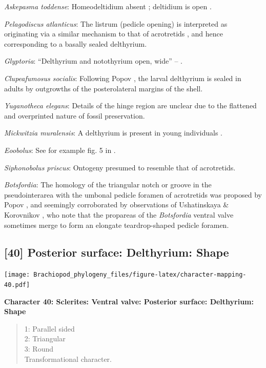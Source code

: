 \documentclass[]{book}
\theoremstyle{definition}
\theoremstyle{definition}
\theoremstyle{definition}
\theoremstyle{remark}
\begin{document}
\emph{Askepasma toddense}: Homeodeltidium absent
\citep[p.~153]{Williams2000BrachiopodaLinguliformea}; deltidium is open
\citep[see][fig. 4]{Topper2013Theoldest}.

\emph{Pelagodiscus atlanticus}: The listrum (pedicle opening) is
interpreted as originating via a similar mechanism to that of
acrotretids \citep{Popov1992TheCambrian}, and hence corresponding to a
basally sealed delthyrium.

\emph{Glyptoria}: ``Delthyrium and notothyrium open, wide'' --
\citet{Cooper1976LowerCambrian}.

\emph{Clupeafumosus socialis}: Following Popov
\citeyearpar{Popov1992TheCambrian}, the larval delthyrium is sealed in
adults by outgrowths of the posterolateral margins of the shell.

\emph{Yuganotheca elegans}: Details of the hinge region are unclear due
to the flattened and overprinted nature of fossil preservation.

\emph{Mickwitzia muralensis}: A delthyrium is present in young
individuals \citep{Balthasar2004Shellstructure}.

\emph{Eoobolus}: See for example fig. 5 in
\citet{Balthasar2009Thebrachiopod}.

\emph{Siphonobolus priscus}: Ontogeny presumed to resemble that of
acrotretids.

\emph{Botsfordia}: The homology of the triangular notch or groove in the
pseudointerarea with the umbonal pedicle foramen of acrotretids was
proposed by Popov \citeyearpar{Popov1992TheCambrian}, and seemingly
corroborated by observations of Ushatinskaya \& Korovnikov
\citeyearpar{Ushatinskaya2016Revisionof}, who note that the propareas of
the \emph{Botsfordia} ventral valve sometimes merge to form an elongate
teardrop-shaped pedicle foramen.

\hypertarget{posterior-surface-delthyrium-shape}{%
\subsection*{{[}40{]} Posterior surface: Delthyrium:
Shape}\label{posterior-surface-delthyrium-shape}}

\texttt{[image: Brachiopod\_phylogeny\_files/figure-latex/character-mapping-40.pdf]}

\textbf{Character 40: Sclerites: Ventral valve: Posterior surface:
Delthyrium: Shape}

\begin{quote}
1: Parallel sided\\
2: Triangular\\
3: Round\\
Transformational character.
\end{quote}
\end{document}
